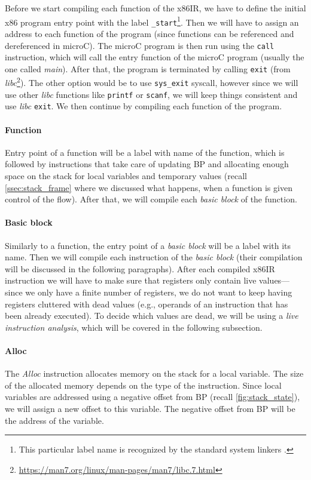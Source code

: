 \documentclass[thesis=M,english]{FITthesis}[2019/12/23]
\begin{document}
Before we start compiling each function of the x86IR, we have to define the initial x86 program entry point with the label \texttt{\_start}\footnote{This particular label name is recognized by the standard system linkers \cite[Chap. 4.6]{x86_assembly}.}. Then we will have to assign an address to each function of the program (since functions can be referenced and dereferenced in microC). The microC program is then run using the \texttt{call} instruction, which will call the entry function of the microC program (usually the one called \emph{main}). After that, the program is terminated by calling \texttt{exit} (from \emph{libc}\footnote{\url{https://man7.org/linux/man-pages/man7/libc.7.html}}). The other option would be to use \texttt{sys\_exit} syscall, however since we will use other \emph{libc} functions like \texttt{printf} or \texttt{scanf}, we will keep things consistent and use \emph{libc} \texttt{exit}. We then continue by compiling each function of the program.

\paragraph*{Function} Entry point of a function will be a label with name of the function, which is followed by instructions that take care of updating BP and allocating enough space on the stack for local variables and temporary values (recall \autoref{ssec:stack_frame} where we discussed what happens, when a function is given control of the flow). After that, we will compile each \emph{basic block} of the function.

\paragraph*{Basic block} Similarly to a function, the entry point of a \emph{basic block} will be a label with its name. Then we will compile each instruction of the \emph{basic block} (their compilation will be discussed in the following paragraphs). After each compiled x86IR instruction we will have to make sure that registers only contain live values---since we only have a finite number of registers, we do not want to keep having registers cluttered with dead values (e.g., operands of an instruction that has been already executed). To decide which values are dead, we will be using a \emph{live instruction analysis}, which will be covered in the following subsection.

\paragraph*{Alloc} The \emph{Alloc} instruction allocates memory on the stack for a local variable. The size of the allocated memory depends on the type of the instruction. Since local variables are addressed using a negative offset from BP (recall \autoref{fig:stack_state}), we will assign a new offset to this variable. The negative offset from BP will be the address of the variable.
\end{document}
